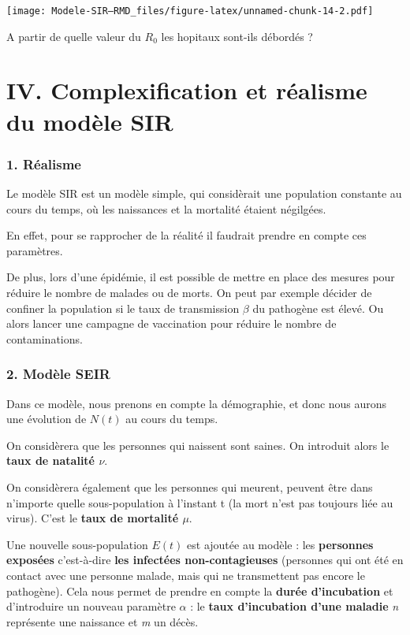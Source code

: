\documentclass[
]{article}
\begin{document}
\texttt{[image: Modele-SIR---RMD\_files/figure-latex/unnamed-chunk-14-2.pdf]}

A partir de quelle valeur du \(R_0\) les hopitaux sont-ils débordés ?

\hypertarget{iv.-complexification-et-ruxe9alisme-du-moduxe8le-sir}{%
\section{IV. Complexification et réalisme du modèle
SIR}\label{iv.-complexification-et-ruxe9alisme-du-moduxe8le-sir}}

\hypertarget{ruxe9alisme}{%
\subsubsection{1. Réalisme}\label{ruxe9alisme}}

Le modèle SIR est un modèle simple, qui considèrait une population
constante au cours du temps, où les naissances et la mortalité étaient
négilgées.

En effet, pour se rapprocher de la réalité il faudrait prendre en compte
ces paramètres.

De plus, lors d'une épidémie, il est possible de mettre en place des
mesures pour réduire le nombre de malades ou de morts. On peut par
exemple décider de confiner la population si le taux de transmission
\(\beta\) du pathogène est élevé. Ou alors lancer une campagne de
vaccination pour réduire le nombre de contaminations.

\hypertarget{moduxe8le-seir}{%
\subsubsection{2. Modèle SEIR}\label{moduxe8le-seir}}

Dans ce modèle, nous prenons en compte la démographie, et donc nous
aurons une évolution de \(N(t)\) au cours du temps.

On considèrera que les personnes qui naissent sont saines. On introduit
alors le \textbf{taux de natalité \(\nu\)}.

On considèrera également que les personnes qui meurent, peuvent être
dans n'importe quelle sous-population à l'instant t (la mort n'est pas
toujours liée au virus). C'est le \textbf{taux de mortalité \(\mu\)}.

Une nouvelle sous-population \(E(t)\) est ajoutée au modèle : les
\textbf{personnes exposées} c'est-à-dire \textbf{les infectées
non-contagieuses} (personnes qui ont été en contact avec une personne
malade, mais qui ne transmettent pas encore le pathogène). Cela nous
permet de prendre en compte la \textbf{durée d'incubation} et
d'introduire un nouveau paramètre \(\alpha\) : le \textbf{taux
d'incubation d'une maladie} \emph{n} représente une naissance et
\emph{m} un décès.
\end{document}

